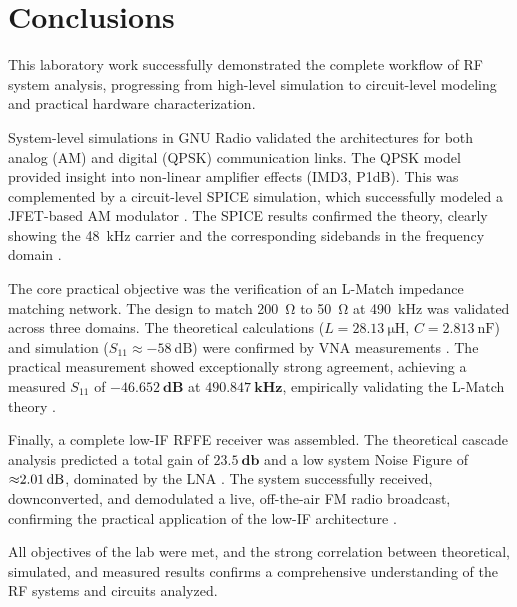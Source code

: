 \section{Conclusions}

This laboratory work successfully demonstrated the complete workflow of RF system analysis, progressing from high-level simulation to circuit-level modeling and practical hardware characterization.

System-level simulations in GNU Radio validated the architectures for both analog (AM) and digital (QPSK) communication links. The QPSK model provided insight into non-linear amplifier effects (IMD3, P1dB). This was complemented by a circuit-level SPICE simulation, which successfully modeled a JFET-based AM modulator . The SPICE results confirmed the theory, clearly showing the \SI{48}{\kilo\hertz} carrier and the corresponding sidebands in the frequency domain .

The core practical objective was the verification of an L-Match impedance matching network. The design to match \SI{200}{\ohm} to \SI{50}{\ohm} at \SI{490}{\kilo\hertz} was validated across three domains. The theoretical calculations ($L=\SI{28.13}{\micro\henry}$, $C=\SI{2.813}{\nano\farad}$) and simulation ($S_{11} \approx \SI{-58}{\deci\bel}$) were confirmed by VNA measurements . The practical measurement showed exceptionally strong agreement, achieving a measured $S_{11}$ of $\mathbf{\SI{-46.652}{\deci\bel}}$ at $\mathbf{\SI{490.847}{\kilo\hertz}}$, empirically validating the L-Match theory .

Finally, a complete low-IF RFFE receiver was assembled. The theoretical cascade analysis predicted a total gain of $\mathbf{\SI{23.5}{\decibel}}$ and a low system Noise Figure of $\mathbf{\SI{\approx 2.01}{\decibel}}$, dominated by the LNA . The system successfully received, downconverted, and demodulated a live, off-the-air FM radio broadcast, confirming the practical application of the low-IF architecture .

All objectives of the lab were met, and the strong correlation between theoretical, simulated, and measured results confirms a comprehensive understanding of the RF systems and circuits analyzed.